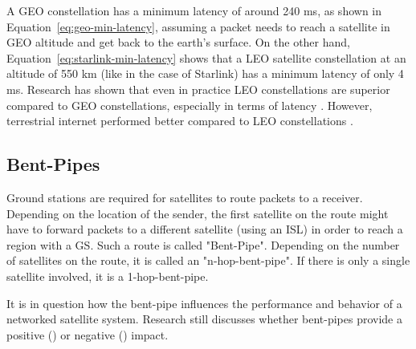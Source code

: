 A \ac{GEO} constellation has a minimum latency of around 240 ms, as shown in Equation~\ref{eq:geo-min-latency}, assuming a packet needs to reach a satellite in GEO altitude and get back to the earth's surface.
On the other hand, Equation~\ref{eq:starlink-min-latency} shows that a \ac{LEO} satellite constellation at an altitude of 550 km (like in the case of Starlink) has a minimum latency of only 4 ms.
Research has shown that even in practice \ac{LEO} constellations are superior compared to \ac{GEO} constellations, especially in terms of latency \cite{DBLP:journals/pacmnet/RamanVCSZ23, Segan2020}.
However, terrestrial internet performed better compared to \ac{LEO} constellations \cite{DBLP:conf/www/MohanFCBRMO24, DBLP:conf/infocom/MaCZCML23}.

\subsection{Bent-Pipes} \label{sec:bent-pipes}

Ground stations are required for satellites to route packets to a receiver. Depending on the location of the sender, the first satellite on the route might have to forward packets to a different satellite (using an \ac{ISL}) in order to reach a region with a \ac{GS}. Such a route is called "Bent-Pipe". Depending on the number of satellites on the route, it is called an "n-hop-bent-pipe". If there is only a single satellite involved, it is a 1-hop-bent-pipe.

It is in question how the bent-pipe influences the performance and behavior of a networked satellite system. Research still discusses whether bent-pipes provide a positive (\cite{Hauri2020}) or negative (\cite{DBLP:conf/www/MohanFCBRMO24}) impact.

